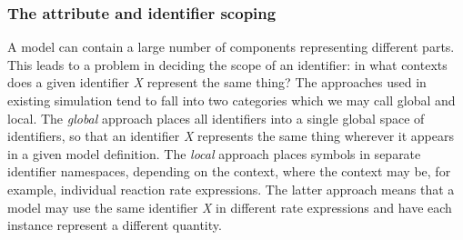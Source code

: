 \subsubsection{The  attribute and identifier scoping}
\label{sec:identifiers}

A model can contain a large number of components representing
different parts.  This leads to a problem in deciding the scope of
an identifier: in what contexts does a given identifier \emph{X}
represent the same thing?  The approaches used in existing
simulation  tend to fall into two categories which we may
call global and local.  The \emph{global} approach places all
identifiers into a single global space of identifiers, so that an
identifier \emph{X} represents the same thing wherever it appears
in a given model definition.  The \emph{local} approach places
symbols in separate identifier namespaces, depending on the
context, where the context may be, for example, individual
reaction rate expressions.  The latter approach means that a model
may use the same identifier \emph{X} in different rate expressions
and have each instance represent a different quantity.

